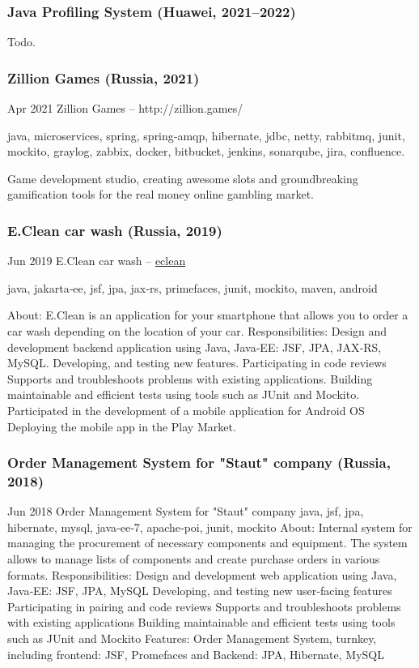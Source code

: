 \documentclass{vl}
\begin{document}
    \subsubsection{Java Profiling System (Huawei, 2021--2022)}

    Todo.

    \subsubsection{Zillion Games (Russia, 2021)}

    Apr 2021 Zillion Games – http://zillion.games/

    java, microservices, spring, spring‐amqp, hibernate, jdbc, netty, rabbitmq, junit, mockito, graylog, zabbix, docker,
    bitbucket, jenkins, sonarqube, jira, confluence.

    Game development studio, creating awesome slots and groundbreaking gamification tools for the real money online
    gambling market.

    \subsubsection{E.Clean car wash (Russia, 2019)}
    Jun 2019 E.Clean car wash – \href{https://play.google.com/store/apps/details?id=com.altinntech.eclean}{eclean}

    java, jakarta‐ee, jsf, jpa, jax‐rs, primefaces, junit, mockito, maven, android

    About: E.Clean is an application for your smartphone that allows you to order a car wash depending on the location
    of your car.
    Responsibilities: Design and development backend application using Java, Java‐EE: JSF, JPA, JAX‐RS, MySQL.
    Developing, and testing new features. Participating in code reviews Supports and troubleshoots problems with
    existing applications. Building maintainable and efficient tests using tools such as JUnit and Mockito.
    Participated in the development of a mobile application for Android OS Deploying the mobile app in the Play Market.

    \subsubsection{Order Management System for "Staut" company (Russia, 2018)}
    Jun 2018 Order Management System for "Staut" company
    java, jsf, jpa, hibernate, mysql, java‐ee‐7, apache‐poi, junit, mockito
    About: Internal system for managing the procurement of necessary components and equipment. The system allows to
    manage lists of components and create purchase orders in various formats.
    Responsibilities:
    Design and development web application using Java, Java‐EE: JSF, JPA, MySQL
    Developing, and testing new user‐facing features
    Participating in pairing and code reviews
    Supports and troubleshoots problems with existing applications
    Building maintainable and efficient tests using tools such as JUnit and Mockito
    Features:
    Order Management System, turnkey, including frontend: JSF, Promefaces and Backend: JPA, Hibernate, MySQL
\end{document}
